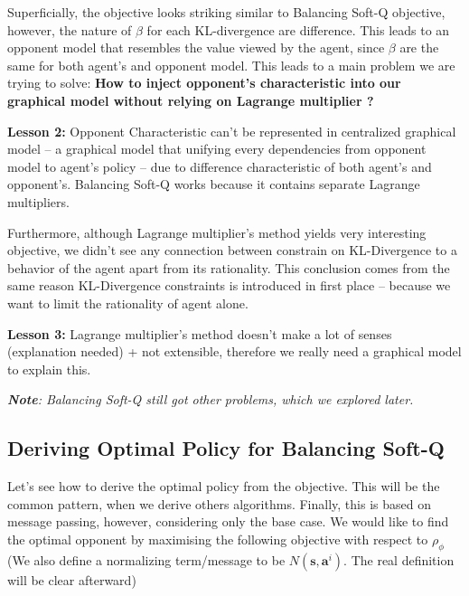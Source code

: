 Superficially, the objective looks striking similar to Balancing Soft-Q objective, however, the nature of $\beta$ for each KL-divergence are difference.  This leads to an opponent model that resembles the value viewed by the agent, since $\beta$ are the same for both agent's and opponent model. This leads to a main problem we are trying to solve: \textbf{How to inject opponent's characteristic into our graphical model without relying on Lagrange multiplier ?}

\begin{tcolorbox}
\textbf{Lesson 2: } Opponent Characteristic can't be represented in centralized graphical model -- a graphical model that unifying every dependencies from opponent model to agent's policy -- due to difference characteristic of both agent's and opponent's. Balancing Soft-Q works because it contains separate Lagrange multipliers.
\end{tcolorbox}

Furthermore, although Lagrange multiplier's method yields very interesting objective, we didn't see any connection between constrain on KL-Divergence to a behavior of the agent apart from its rationality. This conclusion comes from the same reason KL-Divergence constraints is introduced in first place -- because we want to limit the rationality of agent alone. 

\begin{tcolorbox}
\textbf{Lesson 3: } Lagrange multiplier's method doesn't make a lot of senses (explanation needed) + not extensible, therefore we really need a graphical model to explain this.
\end{tcolorbox}
\emph{\textbf{Note}: Balancing Soft-Q still got other problems, which we explored later.}  

\subsection{Deriving Optimal Policy for Balancing Soft-Q}
Let's see how to derive the optimal policy from the objective. This will be the common pattern, when we derive others algorithms. Finally, this is based on \cite{levine2018reinforcement} message passing, however, considering only the base case. We would like to find the optimal opponent by maximising the following objective with respect to $\rho_{\phi}$ (We also define a normalizing term/message to be $N(\boldsymbol{s}, \boldsymbol{a}^i)$. The real definition will be clear afterward)

